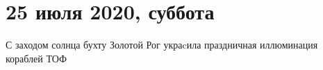  
 
  
\clearpage
\section{25 июля 2020, суббота}
\label{sec:25_07_2020}


С заходом солнца бухту Золотой Рог украcила праздничная иллюминация кораблей ТОФ


